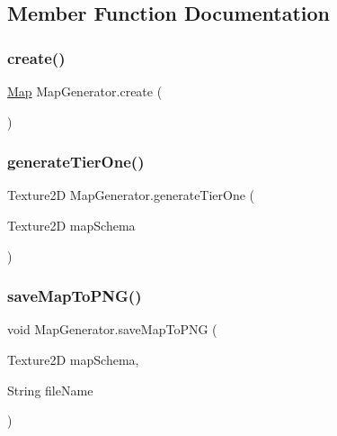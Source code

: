 \subsection{Member Function Documentation}
\mbox{\label{class_map_generator_a7c4d8151a385e31bf263f0378a967076}} 
\subsubsection{\texorpdfstring{create()}{create()}}
{\footnotesize\ttfamily \mbox{\hyperlink{class_map}{Map}} Map\+Generator.\+create (\begin{DoxyParamCaption}{ }\end{DoxyParamCaption})}

\mbox{\label{class_map_generator_aaf73b3dcb37b0693ead016e954541113}} 
\subsubsection{\texorpdfstring{generate\+Tier\+One()}{generateTierOne()}}
{\footnotesize\ttfamily Texture2D Map\+Generator.\+generate\+Tier\+One (\begin{DoxyParamCaption}\item[{Texture2D}]{map\+Schema }\end{DoxyParamCaption})}

\mbox{\label{class_map_generator_ac9f9a5c3edfe74cbcca1d3fe6d64e84f}} 
\subsubsection{\texorpdfstring{save\+Map\+To\+P\+N\+G()}{saveMapToPNG()}}
{\footnotesize\ttfamily void Map\+Generator.\+save\+Map\+To\+P\+NG (\begin{DoxyParamCaption}\item[{Texture2D}]{map\+Schema,  }\item[{String}]{file\+Name }\end{DoxyParamCaption})}

